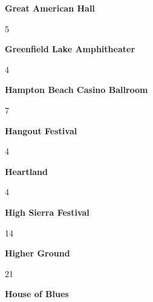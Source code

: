 \newline 
\begin{center}\textbf{Great American Hall}\end{center}
\begin{center}5\end{center} 
\newline 
\begin{center}\textbf{Greenfield Lake Amphitheater}\end{center}
\begin{center}4\end{center} 
\newline 
\begin{center}\textbf{Hampton Beach Casino Ballroom}\end{center}
\begin{center}7\end{center} 
\newline 
\begin{center}\textbf{Hangout Festival}\end{center}
\begin{center}4\end{center} 
\newline 
\begin{center}\textbf{Heartland}\end{center}
\begin{center}4\end{center} 
\newline 
\begin{center}\textbf{High Sierra Festival}\end{center}
\begin{center}14\end{center} 
\newline 
\begin{center}\textbf{Higher Ground}\end{center}
\begin{center}21\end{center} 
\newline 
\begin{center}\textbf{House of Blues}\end{center}
